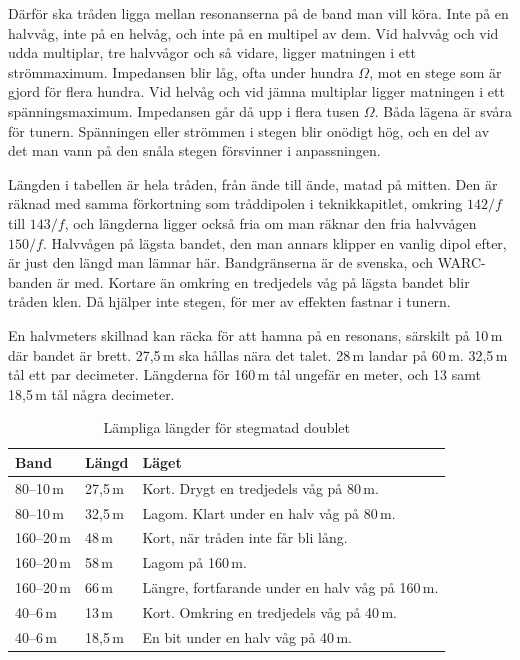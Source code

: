 Därför ska tråden ligga mellan resonanserna på de band man vill köra.
Inte på en halvvåg, inte på en helvåg, och inte på en multipel av dem.
Vid halvvåg och vid udda multiplar, tre halvvågor och så vidare,
ligger matningen i ett strömmaximum. Impedansen blir låg, ofta under
hundra $\Omega$, mot en stege som är gjord för flera hundra. Vid
helvåg och vid jämna multiplar ligger matningen i ett
spänningsmaximum.  Impedansen går då upp i flera tusen $\Omega$. Båda
lägena är svåra för tunern. Spänningen eller strömmen i stegen blir
onödigt hög, och en del av det man vann på den snåla stegen försvinner
i anpassningen.

Längden i tabellen är hela tråden, från ände till ände, matad på
mitten. Den är räknad med samma förkortning som tråddipolen i
teknikkapitlet, omkring $142/f$ till $143/f$, och längderna ligger
också fria om man räknar den fria halvvågen $150/f$. Halvvågen på
lägsta bandet, den man annars klipper en vanlig dipol efter, är just
den längd man lämnar här. Bandgränserna är de svenska, och WARC-banden
är med. Kortare än omkring en tredjedels våg på lägsta bandet blir
tråden klen. Då hjälper inte stegen, för mer av effekten fastnar i
tunern.

En halvmeters skillnad kan räcka för att hamna på en resonans,
särskilt på 10\,m där bandet är brett. 27,5\,m ska hållas nära det
talet.  28\,m landar på 60\,m. 32,5\,m tål ett par
decimeter. Längderna för 160\,m tål ungefär en meter, och 13 samt
18,5\,m tål några decimeter.

\begin{table}[H]
\centering
\begin{tabular}{lll}
	\textbf{Band} & \textbf{Längd} & \textbf{Läget}                                   \\ \hline
	80--10\,m     & 27,5\,m        & Kort. Drygt en tredjedels våg på 80\,m.          \\
	80--10\,m     & 32,5\,m        & Lagom. Klart under en halv våg på 80\,m.         \\
	160--20\,m    & 48\,m          & Kort, när tråden inte får bli lång.              \\
	160--20\,m    & 58\,m          & Lagom på 160\,m.                                 \\
	160--20\,m    & 66\,m          & Längre, fortfarande under en halv våg på 160\,m. \\
	40--6\,m      & 13\,m          & Kort. Omkring en tredjedels våg på 40\,m.        \\
	40--6\,m      & 18,5\,m        & En bit under en halv våg på 40\,m.               \\
\end{tabular}
\caption{Lämpliga längder för stegmatad doublet}
\end{table}


